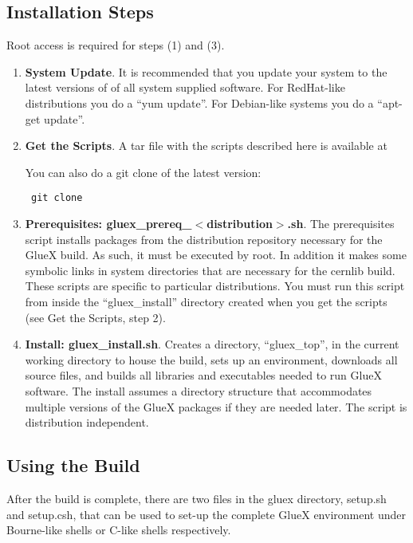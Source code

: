 \documentclass[12pt]{article}
\begin{document}
\subsection{Installation Steps}

Root access is required for steps (1) and (3).

\begin{enumerate}

\item {\bf System Update}. It is recommended that you update your
  system to the latest versions of of all system supplied
  software. For RedHat-like distributions you do a ``yum update''. For
  Debian-like systems you do a ``apt-get update''.

\item {\bf Get the Scripts}. A tar file with the scripts described
  here is available at
  \begin{center}
  \end{center}
You can also do a git clone of the latest version:
\begin{center}\tt
  git clone 
\end{center}

\item {\bf Prerequisites: gluex\_prereq\_$<$distribution$>$.sh}. The
  prerequisites script installs packages from the distribution
  repository necessary for the GlueX build. As such, it must be
  executed by root. In addition it makes some symbolic links in system
  directories that are necessary for the cernlib build. These scripts
  are specific to particular distributions. You must run this
  script from inside the ``gluex\_install'' directory created when you
  get the scripts (see Get the Scripts, step 2).

\item {\bf Install: gluex\_install.sh}. Creates a directory,
  ``gluex\_top'', in the current working directory to house the build,
  sets up an environment, downloads all source files, and builds all
  libraries and executables needed to run GlueX software. The install
  assumes a directory structure that accommodates multiple versions of
  the GlueX packages if they are needed later. The script is
  distribution independent.

\end{enumerate}

\subsection{Using the Build}

After the build is complete, there are two files in the gluex
directory, setup.sh and setup.csh, that can be used to set-up the
complete GlueX environment under Bourne-like shells or C-like shells
respectively.
\end{document}
